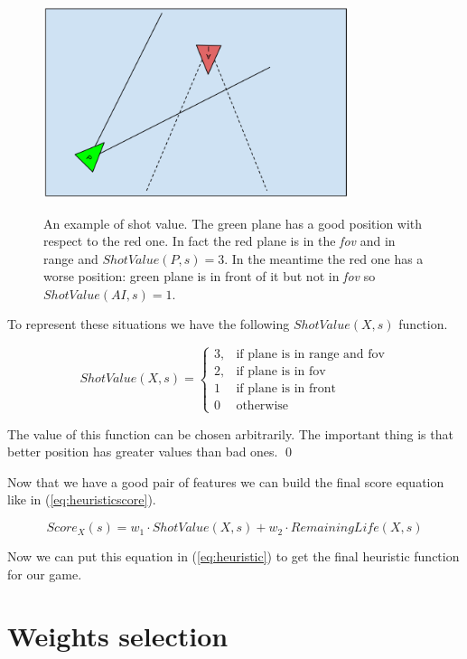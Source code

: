 \begin{figure}
  \centering
  \includegraphics[width=0.8\textwidth]{images/planefov.png}
  \label{img:planefov}
  \caption{An example of shot value. The green plane has a good position with respect to the
  red one. In fact the red plane is in the \emph{fov} and in range and $ShotValue(P,s)=3$. In the
  meantime the red one has a worse position: green plane is in front of it but not in
  \emph{fov} so $ShotValue(AI,s)=1$.}
\end{figure}

To represent these situations we have the following $ShotValue(X,s)$ function.

\begin{equation}
ShotValue(X,s) = \begin{cases} 3, & \mbox{if plane is in range and fov}  \\
  2, & \mbox{if plane is in fov} \\ 1 & \mbox{if plane is in front} \\ 0 & \mbox{otherwise}
\end{cases}
\end{equation}

The value of this function can be chosen arbitrarily. The important thing is that better
position has greater values than bad ones. \qed

Now that we have a good pair of features we can build the final score equation like in
(\ref{eq:heuristicscore}).

\begin{equation}
  Score_X(s) = w_1 \cdot ShotValue(X,s) + w_2 \cdot RemainingLife(X,s)
  \label{eq:heuristicscore}
\end{equation}

Now we can put this equation in (\ref{eq:heuristic}) to get the final heuristic function
for our game.

\section{Weights selection}

